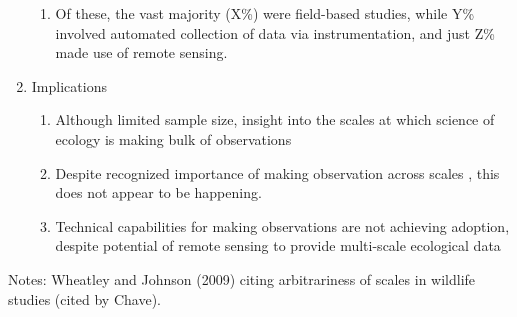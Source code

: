 \documentclass[12pt]{article}
\newcounter{lastnote}
\newenvironment{scilastnote}{%
\setcounter{lastnote}{\value{enumiv}}%
\addtocounter{lastnote}{+1}%
\begin{list}%
{\arabic{lastnote}.}
{\setlength{\leftmargin}{.22in}}
{\setlength{\labelsep}{.5em}}}
{\end{list}}
\begin{document}
\begin{enumerate}
\begin{enumerate}
    \item  Of these, the vast majority (X\%) were field-based studies, while Y\% involved automated collection of data via instrumentation, and just Z\% made use of remote sensing.   
   \end{enumerate}
   \item{Implications} 
   \begin{enumerate}
    \item Although limited sample size, insight into the scales at which science of ecology is making bulk of observations
    \item Despite recognized importance of making observation across scales \cite{levin_problem_1992}, this does not appear to be happening. 
    \item Technical capabilities for making observations are not achieving adoption, despite potential of remote sensing to provide multi-scale ecological data \cite{estes_predictive_2011,estes_habitat_2008} 
   \end{enumerate}

\end{enumerate}

Notes: Wheatley and Johnson (2009) citing arbitrariness of scales in wildlife studies (cited by Chave). 









\end{document}
